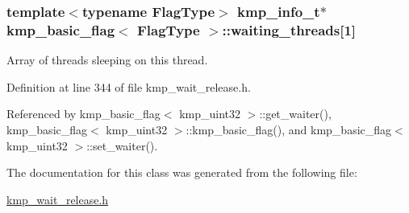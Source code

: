 \hypertarget{classkmp__basic__flag_a7011d738e46e39cd78dfad7eed5e79d5}{
\subsubsection[{waiting\-\_\-threads}]{\setlength{\rightskip}{0pt plus 5cm}template$<$typename Flag\-Type$>$ {\bf kmp\-\_\-info\-\_\-t}$\ast$ {\bf kmp\-\_\-basic\-\_\-flag}$<$ Flag\-Type $>$\-::waiting\-\_\-threads\mbox{[}1\mbox{]}\hspace{0.3cm}{\ttfamily [private]}}}\label{classkmp__basic__flag_a7011d738e46e39cd78dfad7eed5e79d5}
Array of threads sleeping on this thread. 

Definition at line 344 of file kmp\-\_\-wait\-\_\-release.\-h.



Referenced by kmp\-\_\-basic\-\_\-flag$<$ kmp\-\_\-uint32 $>$\-::get\-\_\-waiter(), kmp\-\_\-basic\-\_\-flag$<$ kmp\-\_\-uint32 $>$\-::kmp\-\_\-basic\-\_\-flag(), and kmp\-\_\-basic\-\_\-flag$<$ kmp\-\_\-uint32 $>$\-::set\-\_\-waiter().



The documentation for this class was generated from the following file\-:\begin{DoxyCompactItemize}
\item 
\hyperlink{kmp__wait__release_8h}{kmp\-\_\-wait\-\_\-release.\-h}\end{DoxyCompactItemize}
